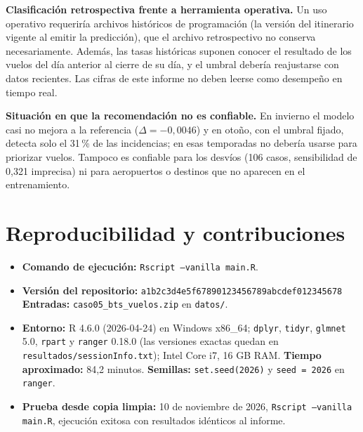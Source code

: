 \documentclass[11pt,a4paper]{article}
\newcommand{\code}[1]{\texttt{#1}}
\begin{document}
\textbf{Clasificación retrospectiva frente a herramienta operativa.} Un uso operativo requeriría archivos históricos de programación (la versión del itinerario vigente al emitir la predicción), que el archivo retrospectivo no conserva necesariamente. Además, las tasas históricas suponen conocer el resultado de los vuelos del día anterior al cierre de su día, y el umbral debería reajustarse con datos recientes. Las cifras de este informe no deben leerse como desempeño en tiempo real.
 
\textbf{Situación en que la recomendación no es confiable.} En invierno el modelo casi no mejora a la referencia ($\Delta=-0{,}0046$) y en otoño, con el umbral fijado, detecta solo el 31\,\% de las incidencias; en esas temporadas no debería usarse para priorizar vuelos. Tampoco es confiable para los desvíos (106 casos, sensibilidad de 0,321 imprecisa) ni para aeropuertos o destinos que no aparecen en el entrenamiento.
 
\section{Reproducibilidad y contribuciones}
\begin{itemize}[leftmargin=*]
  \item \textbf{Comando de ejecución:} \code{Rscript --vanilla main.R}.
  \item \textbf{Versión del repositorio:} \code{a1b2c3d4e5f67890123456789abcdef012345678} \quad \textbf{Entradas:} \code{caso05\_bts\_vuelos.zip} en \code{datos/}.
  \item \textbf{Entorno:} R 4.6.0 (2026-04-24) en Windows x86\_64; \code{dplyr}, \code{tidyr}, \code{glmnet} 5.0, \code{rpart} y \code{ranger} 0.18.0 (las versiones exactas quedan en \code{resultados/sessionInfo.txt}); Intel Core i7, 16 GB RAM. \textbf{Tiempo aproximado:} 84,2 minutos. \textbf{Semillas:} \code{set.seed(2026)} y \code{seed = 2026} en \code{ranger}.
  \item \textbf{Prueba desde copia limpia:} 10 de noviembre de 2026, \code{Rscript --vanilla main.R}, ejecución exitosa con resultados idénticos al informe.
\end{itemize}
 
\end{document}
